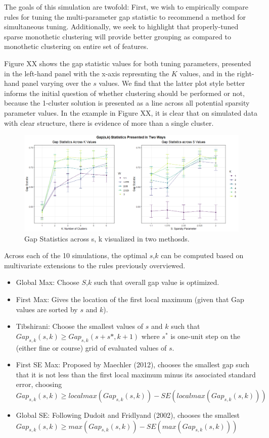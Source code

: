 \documentclass[
]{article}
\providecommand{\tightlist}{%
  \setlength{\itemsep}{0pt}\setlength{\parskip}{0pt}}
\begin{document}
The goals of this simulation are twofold: First, we wish to empirically
compare rules for tuning the multi-parameter gap statistic to recommend
a method for simultaneous tuning. Additionally, we seek to highlight
that properly-tuned sparse monothetic clustering will provide better
grouping as compared to monothetic clustering on entire set of features.

Figure XX shows the gap statistic values for both tuning parameters,
presented in the left-hand panel with the x-axis represnting the \(K\)
values, and in the right-hand panel varying over the \(s\) values. We
find that the latter plot style better informs the initial question of
whether clustering should be performed or not, because the 1-cluster
solution is presented as a line across all potential sparsity parameter
values. In the example in Figure XX, it is clear that on simulated data
with clear structure, there is evidence of more than a single cluster.

\begin{figure}
\includegraphics[width=0.9\linewidth]{Gap2Ways} \caption{Gap Statistics across s, k visualized in two methosds.}\label{fig:GapPlot1}
\end{figure}

Across each of the 10 simulations, the optimal \(s\),\(k\) can be
computed based on multivariate extensions to the rules previously
overviewed.

\begin{itemize}
\tightlist
\item
  Global Max: Choose \(S\),\(k\) such that overall gap value is
  optimized.
\item
  First Max: Gives the location of the first local maximum (given that
  Gap values are sorted by \(s\) and \(k\)).
\item
  Tibshirani: Choose the smallest values of \(s\) and \(k\) such that
  \(Gap_{s,k}(s,k) \geq Gap_{s,k}(s+s*, k+1)\) where \(s^*\) is one-unit
  step on the (either fine or course) grid of evaluated values of \(s\).
\item
  First SE Max: Proposed by Maechler (2012), chooses the smallest gap
  such that it is not less than the first local maximum minus its
  associated standard error, choosing
  \(Gap_{s,k}(s,k) \geq localmax(Gap_{s,k}(s,k)) - SE(localmax(Gap_{s,k}(s,k)))\)
\item
  Global SE: Following Dudoit and Fridlyand (2002), chooses the smallest
  \(Gap_{s,k}(s,k) \geq max(Gap_{s,k}(s,k)) - SE(max(Gap_{s,k}(s,k)))\)
\end{itemize}
\end{document}
